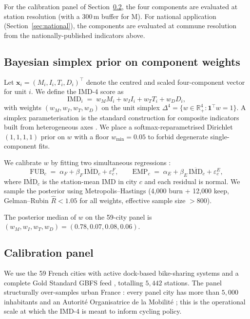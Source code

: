 \documentclass[11pt,a4paper]{article}
\newcommand{\IMD}{\mathrm{IMD}}
\begin{document}
For the calibration panel of Section~\ref{sec:calibration}, the four
components are evaluated at station resolution (with a 300\,m buffer
for M).  For national application (Section~\ref{sec:national}), the
components are evaluated at commune resolution from the
nationally-published indicators above.

\subsection{Bayesian simplex prior on component weights}
\label{sec:bayes}

Let $\mathbf{x}_i = (M_i, I_i, T_i, D_i)^{\top}$ denote the centred
and scaled four-component vector for unit $i$.  We define the IMD-4
score as
\[
    \IMD_i \;=\; w_M M_i + w_I I_i + w_T T_i + w_D D_i,
\]
with weights $(w_M, w_I, w_T, w_D)$ on the unit simplex
$\Delta^{4} = \{ w \in \mathbb{R}_{+}^{4} : \mathbf{1}^{\top} w = 1 \}$.
A simplex parameterisation is the standard construction for composite
indicators built from heterogeneous axes
\citep{OECD2008,Saisana2005}.  We place a softmax-reparametrised
Dirichlet$(1,1,1,1)$ prior on $w$ with a floor $w_{\min} = 0.05$
to forbid degenerate single-component fits.

We calibrate $w$ by fitting two simultaneous regressions :
\[
    \mathrm{FUB}_c \;=\; \alpha_F + \beta_F\, \overline{\IMD}_c + \varepsilon^{F}_{c}, \qquad
    \mathrm{EMP}_c \;=\; \alpha_E + \beta_E\, \overline{\IMD}_c + \varepsilon^{E}_{c},
\]
where $\overline{\IMD}_c$ is the station-mean IMD in city $c$ and
each residual is normal.  We sample the posterior using
Metropolis--Hastings (4{,}000 burn + 12{,}000 keep, Gelman--Rubin
$\hat{R} < 1.05$ for all weights, effective sample size $> 800$).

The posterior median of $w$ on the 59-city panel is
$(w_M, w_I, w_T, w_D) = (0.78, 0.07, 0.08, 0.06)$.

\subsection{Calibration panel}
\label{sec:calibration}

We use the 59 French cities with active dock-based bike-sharing
systems and a complete Gold Standard GBFS feed \citep{Fosse2026gold},
totalling $5{,}442$ stations.
The panel structurally over-samples urban France : every panel city
has more than $5{,}000$ inhabitants and an Autorit\'e Organisatrice
de la Mobilit\'e ; this is the operational scale at which the IMD-4
is meant to inform cycling policy.
\end{document}
